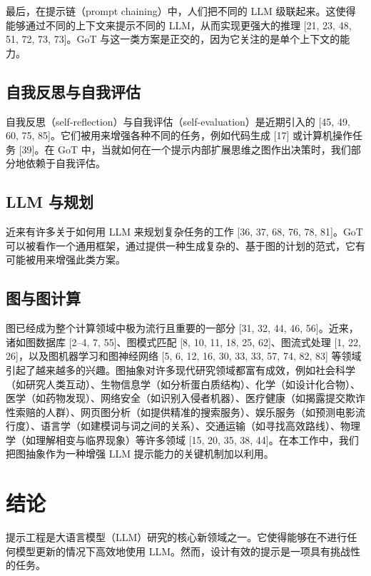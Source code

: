 \documentclass[11pt,UTF8,fontset=fandol]{ctexart}
\begin{document}
最后，在提示链（prompt chaining）中，人们把不同的 LLM 级联起来。这使得能够通过不同的上下文来提示不同的 LLM，从而实现更强大的推理 [21, 23, 48, 51, 72, 73, 73]。GoT 与这一类方案是正交的，因为它关注的是单个上下文的能力。

\subsection{自我反思与自我评估}

自我反思（self-reflection）与自我评估（self-evaluation）是近期引入的 [45, 49, 60, 75, 85]。它们被用来增强各种不同的任务，例如代码生成 [17] 或计算机操作任务 [39]。在 GoT 中，当就如何在一个提示内部扩展思维之图作出决策时，我们部分地依赖于自我评估。

\subsection{LLM 与规划}

近来有许多关于如何用 LLM 来规划复杂任务的工作 [36, 37, 68, 76, 78, 81]。GoT 可以被看作一个通用框架，通过提供一种生成复杂的、基于图的计划的范式，它有可能被用来增强此类方案。

\subsection{图与图计算}

图已经成为整个计算领域中极为流行且重要的一部分 [31, 32, 44, 46, 56]。近来，诸如图数据库 [2--4, 7, 55]、图模式匹配 [8, 10, 11, 18, 25, 62]、图流式处理 [1, 22, 26]，以及图机器学习和图神经网络 [5, 6, 12, 16, 30, 33, 33, 57, 74, 82, 83] 等领域引起了越来越多的兴趣。图抽象对许多现代研究领域都富有成效，例如社会科学（如研究人类互动）、生物信息学（如分析蛋白质结构）、化学（如设计化合物）、医学（如药物发现）、网络安全（如识别入侵者机器）、医疗健康（如揭露提交欺诈性索赔的人群）、网页图分析（如提供精准的搜索服务）、娱乐服务（如预测电影流行度）、语言学（如建模词与词之间的关系）、交通运输（如寻找高效路线）、物理学（如理解相变与临界现象）等许多领域 [15, 20, 35, 38, 44]。在本工作中，我们把图抽象作为一种增强 LLM 提示能力的关键机制加以利用。

\section{结论}

提示工程是大语言模型（LLM）研究的核心新领域之一。它使得能够在不进行任何模型更新的情况下高效地使用 LLM。然而，设计有效的提示是一项具有挑战性的任务。
\end{document}
